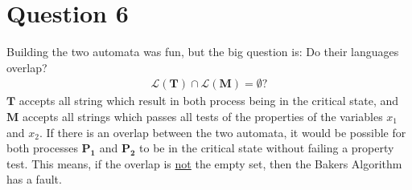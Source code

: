 \section*{Question 6}

Building the two automata was fun, but the big question is: Do their languages overlap?
\begin{gather*}
    \mathcal{L}(\mathbf{T}) \cap \mathcal{L}(\mathbf{M}) = \emptyset?
\end{gather*}
$\mathbf{T}$ accepts all string which result in both process being in the critical state, and $\mathbf{M}$ accepts all strings which passes all tests of the properties of the variables $x_1$ and $x_2$. If there is an overlap between the two automata, it would be possible for both processes $\mathbf{P_1}$ and $\mathbf{P_2}$ to be in the critical state without failing a property test. This means, if the overlap is \underline{not} the empty set, then the Bakers Algorithm has a fault.